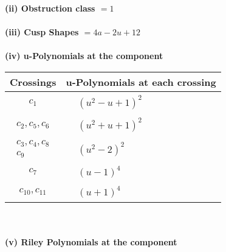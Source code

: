 \documentclass[1p]{elsarticle_modified}
\theoremstyle{definition}
\begin{document}
\flushleft \textbf{(ii) Obstruction class $= 1$}\\~\\
\flushleft \textbf{(iii) Cusp Shapes $= 4 a-2 u+12$}\\~\\
\newpage\renewcommand{\arraystretch}{1}
\flushleft \textbf{(iv) u-Polynomials at the component}\newline \\
\begin{tabular}{m{50pt}|m{274pt}}
Crossings & \hspace{64pt}u-Polynomials at each crossing \\
\hline $$\begin{aligned}c_{1}\end{aligned}$$&$\begin{aligned}
&(u^2- u+1)^2
\end{aligned}$\\
\hline $$\begin{aligned}c_{2},c_{5},c_{6}\end{aligned}$$&$\begin{aligned}
&(u^2+u+1)^2
\end{aligned}$\\
\hline $$\begin{aligned}c_{3},c_{4},c_{8}\\c_{9}\end{aligned}$$&$\begin{aligned}
&(u^2-2)^2
\end{aligned}$\\
\hline $$\begin{aligned}c_{7}\end{aligned}$$&$\begin{aligned}
&(u-1)^4
\end{aligned}$\\
\hline $$\begin{aligned}c_{10},c_{11}\end{aligned}$$&$\begin{aligned}
&(u+1)^4
\end{aligned}$\\
\hline
\end{tabular}\\~\\
\newpage\renewcommand{\arraystretch}{1}
\flushleft \textbf{(v) Riley Polynomials at the component}\newline \\
\end{document}
